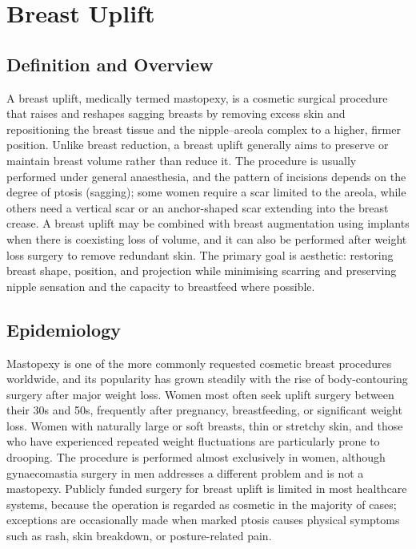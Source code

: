 \chapter{Breast Uplift}

\section*{Definition and Overview}
A breast uplift, medically termed mastopexy, is a cosmetic surgical procedure that raises and reshapes sagging breasts by removing excess skin and repositioning the breast tissue and the nipple--areola complex to a higher, firmer position. Unlike breast reduction, a breast uplift generally aims to preserve or maintain breast volume rather than reduce it. The procedure is usually performed under general anaesthesia, and the pattern of incisions depends on the degree of ptosis (sagging); some women require a scar limited to the areola, while others need a vertical scar or an anchor-shaped scar extending into the breast crease. A breast uplift may be combined with breast augmentation using implants when there is coexisting loss of volume, and it can also be performed after weight loss surgery to remove redundant skin. The primary goal is aesthetic: restoring breast shape, position, and projection while minimising scarring and preserving nipple sensation and the capacity to breastfeed where possible.

\section*{Epidemiology}
Mastopexy is one of the more commonly requested cosmetic breast procedures worldwide, and its popularity has grown steadily with the rise of body-contouring surgery after major weight loss. Women most often seek uplift surgery between their 30s and 50s, frequently after pregnancy, breastfeeding, or significant weight loss. Women with naturally large or soft breasts, thin or stretchy skin, and those who have experienced repeated weight fluctuations are particularly prone to drooping. The procedure is performed almost exclusively in women, although gynaecomastia surgery in men addresses a different problem and is not a mastopexy. Publicly funded surgery for breast uplift is limited in most healthcare systems, because the operation is regarded as cosmetic in the majority of cases; exceptions are occasionally made when marked ptosis causes physical symptoms such as rash, skin breakdown, or posture-related pain.

